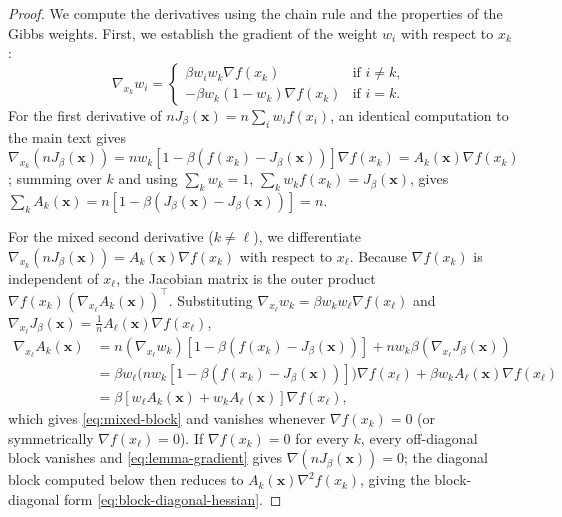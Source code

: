 \documentclass{article} %
\theoremstyle{plain}
\theoremstyle{definition}
\theoremstyle{remark}
\newcommand{\prefactor}[2]{A_{#1}(#2)}
\newcommand{\xx}{\mathbf{x}}
\begin{document}
\begin{proof}
    We compute the derivatives using the chain rule and the properties of the Gibbs weights. First, we establish the gradient of the weight $w_i$ with respect to $x_k$:
    \begin{equation*}
        \nabla_{x_k} w_i = \begin{cases}
            \beta w_i w_k \nabla f(x_k) & \text{if } i \neq k, \\
            -\beta w_k (1 - w_k) \nabla f(x_k) & \text{if } i = k.
        \end{cases}
    \end{equation*}
    For the first derivative of $nJ_\beta(\xx) = n\sum_i w_i f(x_i)$, an identical computation to the main text gives $\nabla_{x_k}(nJ_\beta(\xx)) = nw_k[1-\beta(f(x_k)-J_\beta(\xx))]\nabla f(x_k) = \prefactor{k}{\xx}\nabla f(x_k)$; summing over $k$ and using $\sum_k w_k=1$, $\sum_k w_kf(x_k)=J_\beta(\xx)$, gives $\sum_k\prefactor{k}{\xx}=n[1-\beta(J_\beta(\xx)-J_\beta(\xx))]=n$.

    For the mixed second derivative ($k\ne\ell$), we differentiate $\nabla_{x_k}(nJ_\beta(\xx))=\prefactor{k}{\xx}\nabla f(x_k)$ with respect to $x_\ell$. Because $\nabla f(x_k)$ is independent of $x_\ell$, the Jacobian matrix is the outer product $\nabla f(x_k)(\nabla_{x_\ell}\prefactor{k}{\xx})^\top$. Substituting $\nabla_{x_\ell}w_k=\beta w_kw_\ell\nabla f(x_\ell)$ and $\nabla_{x_\ell}J_\beta(\xx)=\frac1n\prefactor{\ell}{\xx}\nabla f(x_\ell)$,
    \begin{align*}
        \nabla_{x_\ell}\prefactor{k}{\xx} &= n(\nabla_{x_\ell}w_k)\left[1-\beta(f(x_k)-J_\beta(\xx))\right] + nw_k\beta\left(\nabla_{x_\ell}J_\beta(\xx)\right) \\
        &= \beta w_\ell\bigl(nw_k[1-\beta(f(x_k)-J_\beta(\xx))]\bigr)\nabla f(x_\ell) + \beta w_k\prefactor{\ell}{\xx}\nabla f(x_\ell) \\
        &= \beta\left[w_\ell\prefactor{k}{\xx}+w_k\prefactor{\ell}{\xx}\right]\nabla f(x_\ell),
    \end{align*}
    which gives \eqref{eq:mixed-block} and vanishes whenever $\nabla f(x_k)=0$ (or symmetrically $\nabla f(x_\ell)=0$). If $\nabla f(x_k)=0$ for every $k$, every off-diagonal block vanishes and \eqref{eq:lemma-gradient} gives $\nabla(nJ_\beta(\xx))=0$; the diagonal block computed below then reduces to $\prefactor{k}{\xx}\nabla^2f(x_k)$, giving the block-diagonal form \eqref{eq:block-diagonal-hessian}.


\end{proof}
\end{document}
